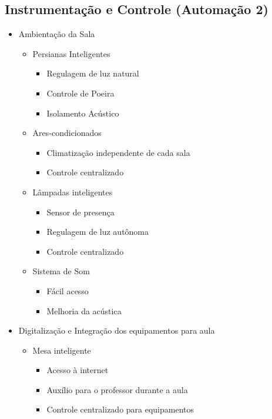 \begin{apendicesenv}
\section{Instrumentação e Controle (Automação 2)}
  \begin{itemize}
    \item Ambientação da Sala
      \begin{itemize}
        \item Persianas Inteligentes
        \begin{itemize}
          \item Regulagem de luz natural
            \item Controle de Poeira
            \item Isolamento Acústico
        \end{itemize}
        \item Ares-condicionados
        \begin{itemize}
          \item Climatização independente de cada sala
            \item Controle centralizado
        \end{itemize}
        \item Lâmpadas inteligentes
        \begin{itemize}
          \item Sensor de presença
            \item Regulagem de luz autônoma
            \item Controle centralizado
        \end{itemize}
        \item Sistema de Som
        \begin{itemize}
          \item Fácil acesso
            \item Melhoria da acústica
        \end{itemize}
      \end{itemize}
    \item Digitalização e Integração dos equipamentos para aula
      \begin{itemize}
        \item Mesa inteligente
        \begin{itemize}
          \item Acesso à internet
            \item Auxílio para o professor durante a aula
            \item Controle centralizado para equipamentos

\end{itemize}
\end{itemize}
\end{itemize}
\end{apendicesenv}
